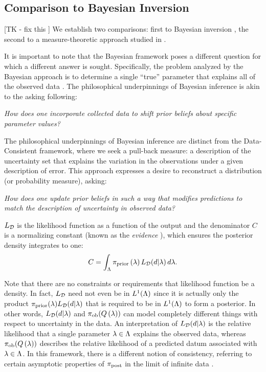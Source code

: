 \subsection{Comparison to Bayesian Inversion}\label{sec:bayesian}
[TK - fix this ] We establish two comparisons: first to Bayesian inversion \cite{Walpole, Berger, Complete, Smith}, the second to a measure-theoretic approach studied in \cite{BET+14, BE13}.

It is important to note that the Bayesian framework poses a different question for which a different answer is sought.
Specifically, the problem analyzed by the Bayesian approach is to determine a single ``true'' parameter that explains all of the observed data \cite{Smith, Concrete, Complete}.
The philosophical underpinnings of Bayesian inference is akin to the asking following:

\begin{center}
  \emph{How does one incorporate collected data to shift prior beliefs about specific parameter values?}
\end{center}

The philosophical underpinnings of Bayesian inference are distinct from the Data-Consistent framework, where we seek a pull-back measure: a description of the uncertainty set that explains the variation in the observations under a given description of error.
This approach expresses a desire to reconstruct a distribution (or probability measure), asking:

\begin{center}
  \emph{How does one update prior beliefs in such a way that modifies predictions to match the description of uncertainty in observed data?}
\end{center}


$L_{\mathcal{D}}$ is the likelihood function as a function of the output and the denominator $C$ is a normalizing constant (known as the \emph{evidence} \cite{Smith}), which ensures the posterior density integrates to one:
\[
C = \int_{\Lambda} \operatorname*{\pi_{prior}}\left ( \lambda \right ) L_{\mathcal{D}}(d | \lambda) \, d\lambda.
\]

Note that there are no constraints or requirements that likelihood function be a density.
In fact, $L_{\mathcal{D}}$ need not even be in $L^1({\Lambda})$ since it is actually only the product $\operatorname*{\pi_{prior}}(\lambda) L_{\mathcal{D}} (d | \lambda)$ that is required to be in $L^1({\Lambda})$ to form a posterior.
In other words, $L_{\mathcal{D}} (d | \lambda)$ and $\operatorname*{\pi_{ob}}(Q\left ( \lambda \right ))$ can model completely different things with respect to uncertainty in the data.
An interpretation of $L_{\mathcal{D}} (d | \lambda)$ is the relative likelihood that a single parameter $\lambda\in{\Lambda}$ explains the observed data, whereas $\operatorname*{\pi_{ob}}(Q\left ( \lambda \right ))$ describes the relative likelihood of a predicted datum associated with $\lambda\in{\Lambda}$.
In this framework, there is a different notion of consistency, referring to certain asymptotic properties of $\operatorname*{\pi_{post}}$ in the limit of infinite data \cite{Barron, Silverman}.



